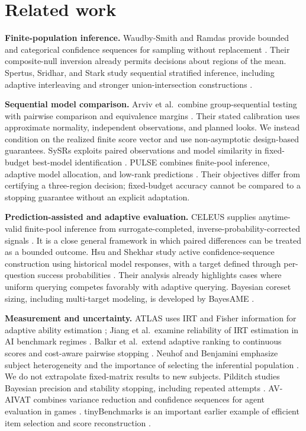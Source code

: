 \section{Related work}\label{sec:2}\label{related-work}

\textbf{Finite-population inference.} Waudby-Smith and Ramdas provide bounded and categorical confidence sequences for sampling without replacement \citep{r1}. Their composite-null inversion already permits decisions about regions of the mean. Spertus, Sridhar, and Stark study sequential stratified inference, including adaptive interleaving and stronger union-intersection constructions \citep{r4}.

\textbf{Sequential model comparison.} Arviv et al.~combine group-sequential testing with pairwise comparison and equivalence margins \citep{r3}. Their stated calibration uses approximate normality, independent observations, and planned looks. We instead condition on the realized finite score vector and use non-asymptotic design-based guarantees. SySRs exploits paired observations and model similarity in fixed-budget best-model identification \citep{r5}. PULSE combines finite-pool inference, adaptive model allocation, and low-rank predictions \citep{r6}. Their objectives differ from certifying a three-region decision; fixed-budget accuracy cannot be compared to a stopping guarantee without an explicit adaptation.

\textbf{Prediction-assisted and adaptive evaluation.} CELEUS supplies anytime-valid finite-pool inference from surrogate-completed, inverse-probability-corrected signals \citep{r7}. It is a close general framework in which paired differences can be treated as a bounded outcome. Hsu and Shekhar study active confidence-sequence construction using historical model responses, with a target defined through per-question success probabilities \citep{r8}. Their analysis already highlights cases where uniform querying competes favorably with adaptive querying. Bayesian coreset sizing, including multi-target modeling, is developed by BayesAME \citep{r9}.

\textbf{Measurement and uncertainty.} ATLAS uses IRT and Fisher information for adaptive ability estimation \citep{r10}; Jiang et al.~examine reliability of IRT estimation in AI benchmark regimes \citep{r11}. Balkır et al.~extend adaptive ranking to continuous scores and cost-aware pairwise stopping \citep{r12}. Neuhof and Benjamini emphasize subject heterogeneity and the importance of selecting the inferential population \citep{r13}. We do not extrapolate fixed-matrix results to new subjects. Pilditch studies Bayesian precision and stability stopping, including repeated attempts \citep{r14}. AV-AIVAT combines variance reduction and confidence sequences for agent evaluation in games \citep{r15}. tinyBenchmarks is an important earlier example of efficient item selection and score reconstruction \citep{r16}.

